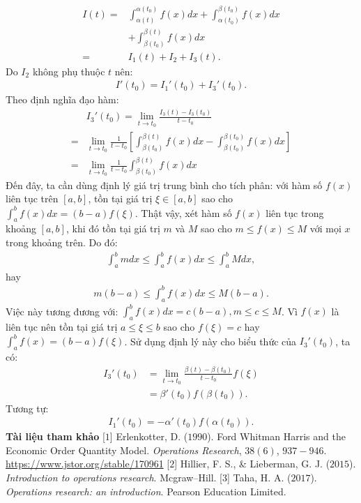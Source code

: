 \begin{multicols}{2}
\begin{align*}
		I(t) =& \int_{\alpha(t)}^{\alpha(t_0)}{f(x)dx} + \int_{\alpha(t_0)}^{\beta(t_0)}{f(x)dx} \\
		&+ \int_{\beta(t_0)}^{\beta(t)}{f(x)dx}\\
		=& I_1(t) + I_2 + I_3(t).
	\end{align*}
	Do $I_2$ không phụ thuộc $t$ nên:
	\begin{align*}
		I'(t_0) = I_1'(t_0) + I_3'(t_0).
	\end{align*}
	Theo định nghĩa đạo hàm:
	\begin{align*}
		&I_3'(t_0)= \mathop {\lim }\limits_{t \to {t_0}} \frac{{{I_3}(t) - {I_3}({t_0})}}{{t - {t_0}}} \\
		= &\mathop {\lim }\limits_{t \to {t_0}} \frac{1}{{t \!-\! {t_0}}}\!\!\left[ \int_{\beta ({t_0})}^{\beta (t)} {f(x)dx}  \!-\! \int_{\beta ({t_0})}^{\beta ({t_0})} {f(x)dx}  \right] \\
		= &\mathop {\lim }\limits_{t \to {t_0}} \frac{1}{{t - {t_0}}}\int_{\beta ({t_0})}^{\beta (t)} {f(x)dx}
	\end{align*}
	Đến đây, ta cần dùng định lý giá trị trung bình cho tích phân: với hàm số $f(x)$ liên tục trên $[a,b]$, tồn tại giá trị $\xi \in [a,b]$ sao cho $\int_a^b{f(x)dx} = (b-a)f(\xi)$. Thật vậy, xét hàm số $f(x)$ liên tục trong khoảng $[a,b]$, khi đó tồn tại giá trị $m$ và $M$ sao cho $m \le f(x) \le M$ với mọi $x$ trong khoảng trên. Do đó:
	\begin{align*}
		\int_a^b{mdx} \le \int_a^b{f(x)dx} \le \int_a^b{Mdx},
	\end{align*}
	hay 
	\begin{align*}
		m(b-a) \le \int_a^b{f(x)dx} \le M (b-a).
	\end{align*}
	Việc này tương đương với: $\int_a^b{f(x)dx} = c(b-a), m \le c \le M$. Vì $f(x)$ là liên tục nên tồn tại giá trị $a \le \xi \le b$ sao cho $f(\xi)= c$ hay $\int_a^b{f(x)} = (b-a)f(\xi)$.
	\vskip 0.1cm
	Sử dụng định lý này cho biểu thức của $I_3'(t_0)$, ta có:
	\begin{align*}
		I_3'(t_0) &= \mathop {\lim }\limits_{t \to {t_0}} \frac{{\beta (t) - \beta ({t_0})}}{{t - {t_0}}}f(\xi ) \\
		&= \beta '({t_0})f\left( {\beta ({t_0})} \right).
	\end{align*}
	Tương tự:
	\begin{align*}
		I_1'(t_0) = - \alpha'(t_0)f\left(\alpha(t_0)\right).
	\end{align*}
	\textbf{\color{toanhocdoisong}Tài liệu tham khảo}
	\vskip 0.1cm
	[$1$] Erlenkotter, D. ($1990$). Ford Whitman Harris and the Economic Order Quantity Model. \textit{Operations Research}, $38(6)$, $937-946$. \url{https://www.jstor.org/stable/170961}
	\vskip 0.1cm
	[$2$] Hillier, F. S., \& Lieberman, G. J. ($2015$). \textit{Introduction to operations research}. Mcgraw--Hill.
	\vskip 0.1cm
	[$3$] Taha, H. A. ($2017$). \textit{Operations research: an introduction}. Pearson Education Limited.
\end{multicols}